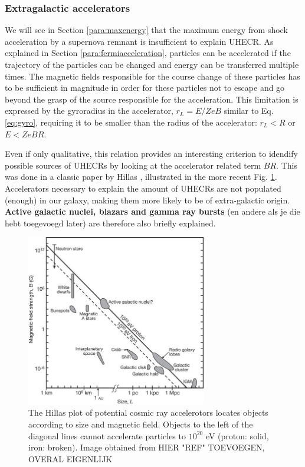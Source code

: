 \subsubsection{Extragalactic accelerators}
We will see in Section \ref{para:maxenergy} that the maximum energy from shock acceleration by a supernova remnant is insufficient to explain UHECR. As explained in Section \ref{para:fermiacceleration}, particles can be accelerated if the trajectory of the particles can be changed and energy can be transferred multiple times. The magnetic fields responsible for the course change of these particles has to be sufficient in magnitude in order for these particles not to escape and go beyond the grasp of the source responsible for the acceleration. This limitation is expressed by the gyroradius in the accelerator, $r_L = E/ZeB$ similar to Eq. \ref{eq:gyro}, requiring it to be smaller than the radius of the accelerator: $r_L < R$ or $E < ZeBR$.

Even if only qualitative, this relation provides an interesting criterion to idendify possible sources of UHECRs by looking at the accelerator related term $BR$. This was done in a classic paper by Hillas \cite{Hillas:1985is}, illustrated in the more recent Fig. \ref{fig:hillas}. Accelerators necessary to explain the amount of UHECRs are not populated (enough) in our galaxy, making them more likely to be of extra-galactic origin. \textbf{Active galactic nuclei, blazars and gamma ray bursts} (en andere als je die hebt toegevoegd later) are therefore also briefly explained.

\begin{figure}
\label{fig:hillas}
\centering
\includegraphics[width = 0.7\textwidth]{chapter3/img/Hillas.jpg}
\caption{The Hillas plot of potential cosmic ray accelerotors locates objects according to size and magnetic field. Objects to the left of the diagonal lines cannot accelerate particles to $10^{20}$ eV (proton: solid, iron: broken). Image obtained from HIER "REF" TOEVOEGEN, OVERAL EIGENLIJK \cite{Bauleo:2009zz}}
\end{figure}



